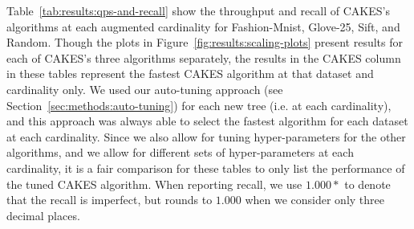 Table~\ref{tab:results:qps-and-recall} show the throughput and recall of CAKES's algorithms at each augmented cardinality for Fashion-Mnist, Glove-25, Sift, and Random. 
Though the plots in Figure~\ref{fig:results:scaling-plots} present results for each of CAKES's three algorithms separately, the results in the CAKES column in these tables represent the fastest CAKES algorithm at that dataset and cardinality only.
We used our auto-tuning approach (see Section~\ref{sec:methods:auto-tuning}) for each new tree (i.e. at each cardinality), and this approach was always able to select the fastest algorithm for each dataset at each cardinality.
Since we also allow for tuning hyper-parameters for the other algorithms, and we allow for different sets of hyper-parameters at each cardinality, it is a fair comparison for these tables to only list the performance of the tuned CAKES algorithm.
When reporting recall, we use $1.000*$ to denote that the recall is imperfect, but rounds to $1.000$ when we consider only three decimal places.


